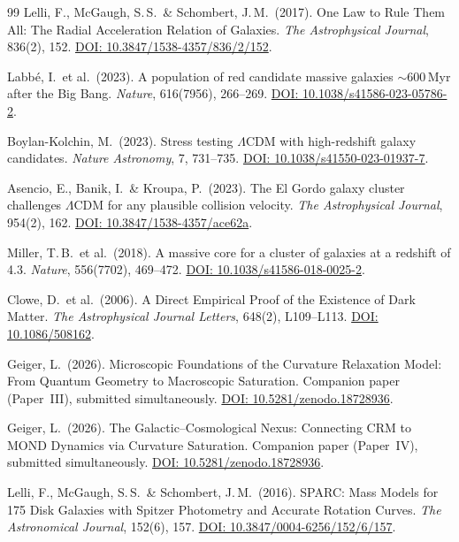 \documentclass[aps,prd,twocolumn,superscriptaddress,nofootinbib]{revtex4-2}
\begin{document}
\begin{thebibliography}{99}
Lelli, F., McGaugh, S.\,S.\ \& Schombert, J.\,M.\ (2017).
One Law to Rule Them All: The Radial Acceleration Relation of Galaxies.
\textit{The Astrophysical Journal}, 836(2), 152.
\href{https://doi.org/10.3847/1538-4357/836/2/152}{DOI: 10.3847/1538-4357/836/2/152}.

Labb\'e, I.\ et al.\ (2023).
A population of red candidate massive galaxies $\sim$600\,Myr after the Big Bang.
\textit{Nature}, 616(7956), 266--269.
\href{https://doi.org/10.1038/s41586-023-05786-2}{DOI: 10.1038/s41586-023-05786-2}.

Boylan-Kolchin, M.\ (2023).
Stress testing $\Lambda$CDM with high-redshift galaxy candidates.
\textit{Nature Astronomy}, 7, 731--735.
\href{https://doi.org/10.1038/s41550-023-01937-7}{DOI: 10.1038/s41550-023-01937-7}.

Asencio, E., Banik, I.\ \& Kroupa, P.\ (2023).
The El Gordo galaxy cluster challenges $\Lambda$CDM for any plausible collision velocity.
\textit{The Astrophysical Journal}, 954(2), 162.
\href{https://doi.org/10.3847/1538-4357/ace62a}{DOI: 10.3847/1538-4357/ace62a}.

Miller, T.\,B.\ et al.\ (2018).
A massive core for a cluster of galaxies at a redshift of 4.3.
\textit{Nature}, 556(7702), 469--472.
\href{https://doi.org/10.1038/s41586-018-0025-2}{DOI: 10.1038/s41586-018-0025-2}.

Clowe, D.\ et al.\ (2006).
A Direct Empirical Proof of the Existence of Dark Matter.
\textit{The Astrophysical Journal Letters}, 648(2), L109--L113.
\href{https://doi.org/10.1086/508162}{DOI: 10.1086/508162}.

Geiger, L.\ (2026).
Microscopic Foundations of the Curvature Relaxation Model: From Quantum Geometry to Macroscopic Saturation.
Companion paper (Paper~III), submitted simultaneously.
\href{https://doi.org/10.5281/zenodo.18728936}{DOI: 10.5281/zenodo.18728936}.

Geiger, L.\ (2026).
The Galactic--Cosmological Nexus: Connecting CRM to MOND Dynamics via Curvature Saturation.
Companion paper (Paper~IV), submitted simultaneously.
\href{https://doi.org/10.5281/zenodo.18728936}{DOI: 10.5281/zenodo.18728936}.

Lelli, F., McGaugh, S.\,S.\ \& Schombert, J.\,M.\ (2016).
SPARC: Mass Models for 175 Disk Galaxies with Spitzer Photometry and Accurate Rotation Curves.
\textit{The Astronomical Journal}, 152(6), 157.
\href{https://doi.org/10.3847/0004-6256/152/6/157}{DOI: 10.3847/0004-6256/152/6/157}.


\end{thebibliography}
\end{document}
